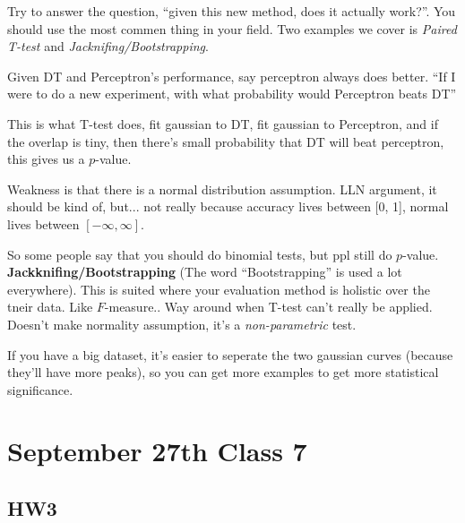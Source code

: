 Try to answer the question, ``given this new method, does it actually
work?''. You should use the most commen thing in your field. Two
examples we cover is \emph{Paired T-test} and \emph{Jacknifing/Bootstrapping}.

Given DT and Perceptron's performance, say perceptron always does better.
``If I were to do a new experiment, with what probability would
Perceptron beats DT''

This is what T-test does, fit gaussian to DT, fit gaussian to
Perceptron, and if the overlap is tiny, then there's small probability
that DT will beat perceptron, this gives us a $p$-value. 

Weakness is that there is a normal distribution assumption. LLN
argument, it should be kind of, but... not really because accuracy
lives between [0, 1], normal lives between $[-\infty, \infty]$.

So some people say that you should do binomial tests, but ppl still do
$p$-value.\\

\textbf{Jackknifing/Bootstrapping} (The word ``Bootstrapping'' is used
a lot everywhere). This is suited where your evaluation method is
holistic over the tneir data. Like $F$-measure.. Way around when T-test can't really be
applied. Doesn't make normality assumption, it's a
\emph{non-parametric} test.

If you have a big dataset, it's easier to seperate the two gaussian
curves (because they'll have more peaks), so you can get more
examples to get more statistical significance.

\pagebreak

\section{September 27th Class 7}
\label{sec:class7}

\subsection{HW3}
\label{sec:hw3}


